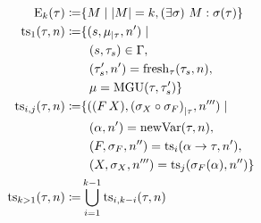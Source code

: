 \documentclass[a4paper,oneside]{memoir}
\begin{document}
\begin{definition}
\begin{align*}
\operatorname{E}_{k}(\tau) \coloneqq& \{ M \mid \lvert M \rvert = k, (\exists \sigma)\  M : \sigma(\tau) \} \\
\operatorname{ts}_{1}(\tau,n) \coloneqq&  \{ (s,{\mu}_{\mid \tau}, n^\prime) \mid \\
 & ~~ (s,\tau_s) \in \Gamma, \\
 & ~~ (\tau_s^\prime,n^\prime) = \operatorname{fresh}_{\tau}(\tau_s, n), \\
 & ~~ \mu = \operatorname{MGU}(\tau,\tau_s^\prime)
\} \\
\operatorname{ts}_{i,j}(\tau,n) \coloneqq& \{ ((F\,X), {(\sigma_{X} \circ \sigma_{F})}_{\mid \tau}, n^{\prime\prime\prime}) \mid \\ 
  & ~~ (\alpha, n^\prime) = \operatorname{newVar}(\tau,n), \\
  & ~~ (F,\sigma_{F},n^{\prime\prime}) = \operatorname{ts}_{i}(\alpha \rightarrow \tau,n^\prime), \\
  & ~~ (X,\sigma_{X},n^{\prime\prime\prime}) = \operatorname{ts}_{j}(\sigma_{F}(\alpha), n^{\prime\prime}) 
\} \\
\operatorname{ts}_{k > 1}(\tau,n) \coloneqq& \bigcup\limits_{i=1}^{k-1}  \operatorname{ts}_{i,k-i}(\tau, n)
\end{align*}
\end{definition}
\end{document}
